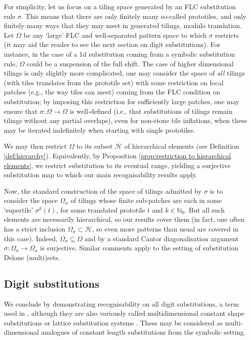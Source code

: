 \documentclass[11pt]{amsart}
\numberwithin{equation}{section}
\theoremstyle{plain}
\theoremstyle{definition}
\newcommand{\N}{\mathbb N}
\newcommand{\sH}{\mathscr{H}}
\newcommand{\sub}{\sigma}
\begin{document}
For simplicity, let us focus on a tiling space generated by an FLC substitution rule \(\sub\). This means that there are only finitely many so-called prototiles, and only finitely many ways that they may meet in generated tilings, modulo translation. Let \(\Omega\) be any `large' FLC and well-separated pattern space to which \(\sub\) restricts (it may aid the reader to see the next section on digit substitutions). For instance, in the case of a 1d substitution coming from a symbolic substitution rule, \(\Omega\) could be a suspension of the full shift. The case of higher dimensional tilings is only slightly more complicated, one may consider the space of \emph{all} tilings (with tiles translates from the prototile set) with some restriction on local patches (e.g., the way tiles can meet) coming from the FLC condition on substitution; by imposing this restriction for sufficiently large patches, one may ensure that \(\sub \colon \Omega \to \Omega\) is well-defined (i.e., that substitutions of tilings remain tilings without any partial overlaps), even for non-stone tile inflations, when these may be iterated indefinitely when starting with single prototiles.

We may then restrict \(\Omega\) to its subset \(\sH\) of hierarchical elements (see Definition \ref{def:hierarchy}). Equivalently, by Proposition \ref{prop:restriction to hierarchical elements}, we restrict substitution to its eventual range, yielding a surjective substitution map to which our main recognisability results apply.

Now, the standard construction of the space of tilings admitted by \(\sub\) is to consider the space \(\Omega_\sub\) of tilings whose finite sub-patches are each in some `supertile' \(\sub^k(t)\), for some translated prototile \(t\) and \(k \in \N_0\). But all such elements are necessarily hierarchical, so our results cover them (in fact, one often has a strict inclusion \(\Omega_\sub \subset \sH\), so even more patterns than usual are covered in this case). Indeed, \(\Omega_\sub \subseteq \Omega\) and by a standard Cantor diagonalisation argument \(\sub \colon \Omega_\sub \to \Omega_\sub\) is surjective. Similar comments apply to the setting of substitution Delone (multi)sets.

\subsection{Digit substitutions}
\label{sec:digit subs}

We conclude by demonstrating recognisability on all digit substitutions, a term used in \cite{FM22,Vin00}, although they are also variously called multidimensional constant shape substitutions \cite{Cab23, CL25} or lattice substitution systems \cite{LMS03, FS07}. These may be considered as multi-dimensional analogues of constant length substitutions from the symbolic setting.
\end{document}
